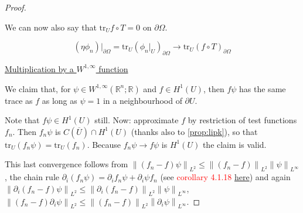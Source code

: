 \documentclass[english,a4paper,12pt,oneside]{scrbook}
\theoremstyle{break}
\newenvironment{mproof}[1][\proofname]{%
  \begin{proof}[#1]$ $\par\nobreak\ignorespaces
}{%
  \end{proof}
}
\renewcommand*{\proofname}{Proof}
\theoremstyle{remark}
\newcommand{\mR}{\mathbb{R}}
\newcommand{\norm}[1]{\left\lVert#1\right\rVert}
\newcommand{\tr}{\text{tr}}
\newcommand{\ind}[1]{\{\text{ #1 }\}}
\begin{document}
\begin{mproof}
We can now also say that $\tr_U f\circ T=0 $ on $\partial \Omega$.

%

$$(\eta \phi_n)|_{\partial \Omega} = \tr_U( \phi_n|_U)_{\partial \Omega} \rightarrow \tr_U(f \circ T)_{\partial \Omega}$$
%
%
%
%

\underline{Multiplication by a $W^{1,\infty}$ function}

We claim that, for $\psi \in W^{1,\infty}(\mR^n;\mR)$ and $f \in H^1(U)$, then $f\psi$ has the same trace as $f$ as long as $\psi = 1$ in a neighbourhood of $\partial U$.

Note that $f\psi \in H^1(U)$ still. Now: approximate $f$ by restriction of test functions $f_n$. Then $f_n \psi$ is $C(\overline{U})\cap H^1(U)$ (thanks also to \cref{prop:lipk}), so that $\tr_U(f_n\psi) = \tr_U(f_n)$. Because $f_n \psi \rightarrow f \psi$ is $H^1(U)$ the claim is valid.

This last convergence follows from $\norm{(f_n-f)\psi}_{L^2}\leq \norm{(f_n-f)}_{L^2}\norm{\psi}_{L^\infty}$, the chain rule $\partial_i(f_n\psi)=\partial_i f_n \psi + \partial_i \psi f_n$ (see \textcolor{red}{corollary 4.1.18 \href{https://www.math.stonybrook.edu/~joa/PUBLICATIONS/SOBOLEV.pdf}{here}}) and again $\norm{\partial_i(f_n-f)\psi}_{L^2}\leq \norm{\partial_i(f_n-f)}_{L^2}\norm{\psi}_{L^\infty}$, $\norm{(f_n-f)\partial_i\psi}_{L^2}\leq \norm{(f_n-f)}_{L^2}\norm{\partial_i\psi}_{L^\infty}$.


\end{mproof}
\end{document}
